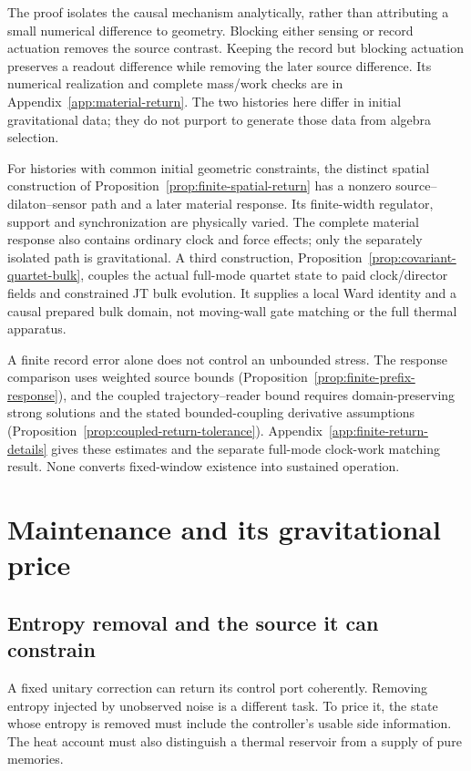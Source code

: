 The proof isolates the causal mechanism analytically, rather than
attributing a small numerical difference to geometry. Blocking either
sensing or record actuation removes the source contrast. Keeping the
record but blocking actuation preserves a readout difference while
removing the later source difference. Its numerical realization and
complete mass/work checks are in Appendix~\ref{app:material-return}.
The two histories here differ in initial gravitational data; they do
not purport to generate those data from algebra selection.

For histories with common initial geometric constraints, the distinct
spatial construction of Proposition~\ref{prop:finite-spatial-return}
has a nonzero source--dilaton--sensor path and a later material response.
Its finite-width regulator, support and synchronization are physically
varied. The complete material response also contains ordinary clock
and force effects; only the separately isolated path is gravitational.
A third construction, Proposition~\ref{prop:covariant-quartet-bulk},
couples the actual full-mode quartet state to paid clock/director
fields and constrained JT bulk evolution. It supplies a local Ward
identity and a causal prepared bulk domain, not moving-wall gate
matching or the full thermal apparatus.

A finite record error alone does not control an unbounded stress.
The response comparison uses weighted source bounds
(Proposition~\ref{prop:finite-prefix-response}), and the coupled
trajectory--reader bound requires domain-preserving strong solutions
and the stated bounded-coupling derivative assumptions
(Proposition~\ref{prop:coupled-return-tolerance}).
Appendix~\ref{app:finite-return-details} gives these estimates and the
separate full-mode clock-work matching result. None converts
fixed-window existence into sustained operation.

\section{Maintenance and its gravitational price}
\label{sec:gap}

\subsection{Entropy removal and the source it can constrain}
\label{sec:maintenance}

A fixed unitary correction can return its control port coherently. Removing entropy
injected by unobserved noise is a different task. To price it, the state whose entropy
is removed must include the controller's usable side information. The heat account
must also distinguish a thermal reservoir from a supply of pure memories.

